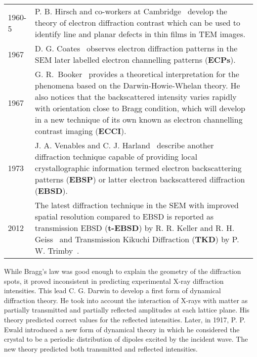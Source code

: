 \begin{table}[htpb]
\begin{tabular}{p{1.2cm}p{11cm}}
  {\small 1960-5} & {\small P. B. Hirsch and co-workers at Cambridge~\cite{Hirsch60, electronMicroscopy} develop the theory of electron diffraction contrast which can be used to identify line and planar defects in thin films in TEM images.}\\
 
  {\small 1967} & {\small D. G. Coates~\cite{Coates67} observes electron diffraction patterns in the SEM later labelled electron channelling patterns (\textbf{ECPs}). }\\
  
  {\small 1967} & {\small  G. R.~Booker~\cite{Booker67} provides a theoretical interpretation for the phenomena based on the Darwin-Howie-Whelan theory. He also notices that the backscattered intensity varies rapidly with orientation close to Bragg condition, which will develop in a new technique of its own known as electron channelling contrast imaging (\textbf{ECCI}).}\\

    {\small 1973} & {\small J. A. Venables and C. J. Harland~\cite{Venables73} describe another diffraction technique capable of providing local crystallographic information termed electron backscattering patterns (\textbf{EBSP}) or latter electron backscattered diffraction (\textbf{EBSD}). }\\
  
   {\small 2012} & {\small The latest diffraction technique in the SEM with improved spatial resolution compared to EBSD is reported as transmission EBSD (\textbf{t-EBSD}) by R. R. Keller and R. H. Geiss~\cite{Keller12} and Transmission Kikuchi Diffraction (\textbf{TKD}) by P. W. Trimby~\cite{Trimby12}. }\\
\bottomrule
\end{tabular}
\end{table}
\renewcommand{\arraystretch}{1.}

While Bragg's law was good enough to explain the geometry of the diffraction spots, it proved inconsistent in predicting experimental X-ray diffraction intensities. This lead C. G. Darwin to develop a first form of dynamical diffraction theory. He took into account the interaction of X-rays with matter as partially transmitted and partially reflected amplitudes at each lattice plane. His theory predicted correct values for the reflected intensities. Later, in 1917, P. P. Ewald introduced a new form of dynamical theory in which he considered the crystal to be a periodic distribution of dipoles excited by the incident wave. The new theory predicted both transmitted and reflected intensities. 

